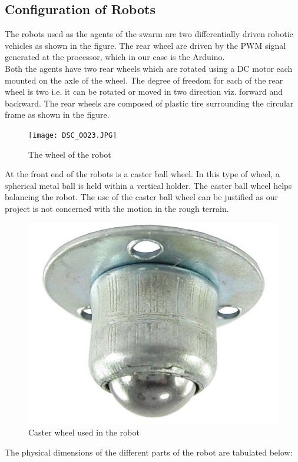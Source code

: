 \subsection{Configuration of Robots}
The robots used as the agents of the swarm are two differentially driven robotic vehicles as shown in the figure. The rear wheel are driven by the PWM signal generated at the processor, which in our case is the Arduino.\\
Both the agents have two rear wheels which are rotated using a DC motor each mounted on the axle of the wheel. The degree of freedom for each of the rear wheel is two i.e. it can be rotated or moved in two direction viz. forward and backward. The rear wheels are composed of plastic tire surrounding the circular frame as shown in the figure.
\begin{figure}[h]
\center
\texttt{[image: DSC\_0023.JPG]}    
\caption{The wheel of the robot}
\end{figure}
\justify At the front end of the robots is a caster ball wheel. In this type of wheel, a spherical metal ball is held within a vertical holder. The caster ball wheel helps balancing the robot. The use of the caster ball wheel can be justified as our project is not concerned with the motion in the rough terrain.
\newpage
\begin{figure}[h]
\center
\includegraphics[scale=0.5]{caster.JPG}    
\caption{Caster wheel used in the robot}
\end{figure}
\justify The physical dimensions of the different parts of the robot are tabulated below:
